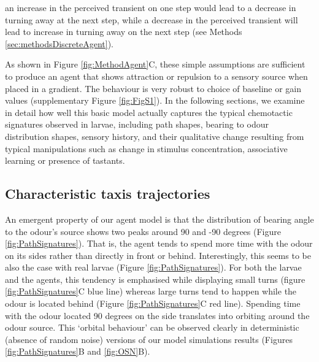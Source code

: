 \documentclass[11pt,a4paper]{article}
\newcommand{\todoBW}[1]{\todo[author=BW,color=orange, size=\tiny,inline]{#1}}
\begin{document}
\begin{itemize}
an increase in the perceived transient on one step would lead to a decrease in turning away at the next step, while a decrease in the perceived transient will lead to increase in turning away on the next step (see Methods \ref{sec:methodsDiscreteAgent}).
\end{itemize}

As shown in Figure \ref{fig:MethodAgent}C, these simple assumptions are sufficient to produce an agent that shows attraction or repulsion
 to a sensory source when placed in a gradient.  The behaviour is very robust to choice of baseline or gain values (supplementary Figure \ref{fig:FigS1}). In the following sections, we examine in detail how well this basic model actually captures the typical chemotactic signatures observed in larvae, including path shapes, bearing to odour distribution shapes, sensory history, and their qualitative change resulting from typical manipulations such as change in stimulus concentration, associative learning or presence of tastants.


\subsection{Characteristic taxis trajectories}
An emergent property of our agent model is that the distribution of bearing angle to the odour's source shows two peaks around 90 and -90 degrees (Figure \ref{fig:PathSignatures}). That is, the agent tends to spend more time with the odour on its sides rather than directly in front or behind. Interestingly, this seems to be also the case with real larvae (Figure \ref{fig:PathSignatures}). For both the larvae and the agents, this tendency is emphasised while displaying small turns (figure \ref{fig:PathSignatures}C blue line) whereas large turns tend to happen while the odour is located behind (Figure \ref{fig:PathSignatures}C red line). Spending time with the odour located 90 degrees on the side translates into orbiting around the odour source. This ‘orbital behaviour’ can be observed clearly in deterministic (absence of random noise) versions of our model simulations results (Figures \ref{fig:PathSignatures}B and \ref{fig:OSN}B).
\end{document}
